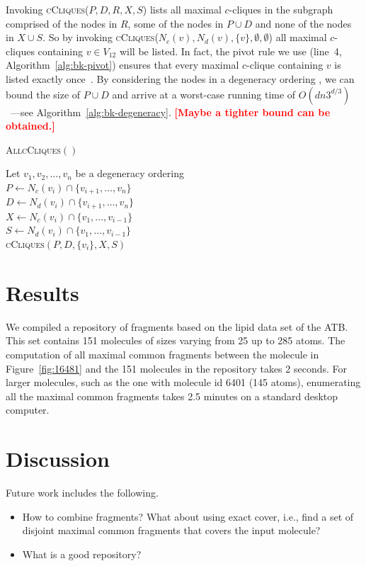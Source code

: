 \documentclass[11pt]{article}
\newcommand{\todo}[1]{\xspace{\bfseries\sffamily\textcolor{red}{[#1]}}\xspace}
\begin{document}
Invoking \textsc{cCliques}($P, D, R, X, S$) lists all maximal $c$-cliques in the
subgraph comprised of the nodes in $R$, some of the nodes in $P \cup D$
and none of the nodes in $X \cup S$. So by invoking \textsc{cCliques}($N_c(v),
N_d(v), \{ v \}, \emptyset, \emptyset$) all maximal $c$-cliques containing $v
\in V_{12}$ will be listed. In fact, the pivot rule we use (line~4,
Algorithm~\ref{alg:bk-pivot}) ensures that every maximal $c$-clique containing
$v$ is listed exactly once~\cite{Tomita:2006kb}. By considering the nodes in a
degeneracy ordering \cite{Eppstein:2010uq}, we can bound the size of $P \cup D$
and arrive at a worst-case running time of
$O(dn3^{d/3})$~\cite{Eppstein:2010uq}---see Algorithm~\ref{alg:bk-degeneracy}.
\todo{Maybe a tighter bound can be obtained.}

\begin{algorithm2e}
  \caption{\textsc{AllcCliques}$()$}
  \label{alg:bk-degeneracy}
  Let $v_1, v_2, \ldots, v_n$ be a degeneracy ordering\\
  {
    $P \leftarrow N_c(v_i) \cap \{v_{i+1}, \ldots, v_n\}$\\
    $D \leftarrow N_d(v_i) \cap \{v_{i+1}, \ldots, v_n\}$\\
    $X \leftarrow N_c(v_i) \cap \{v_1, \ldots, v_{i-1}\}$\\
    $S \leftarrow N_d(v_i) \cap \{v_1, \ldots, v_{i-1}\}$\\
    \textsc{cCliques}$(P, D, \{v_i\}, X, S)$
  }
\end{algorithm2e}

\section{Results}

We compiled a repository of fragments based on the lipid data set of the ATB. 
This set contains 151 molecules of sizes varying from 25 up to 285 atoms. 
The computation of all maximal common fragments between the molecule in 
Figure~\ref{fig:16481} and the 151 molecules in the repository takes 2 seconds. 
For larger molecules, such as the one with molecule id 6401 (145 atoms), 
enumerating all the maximal common fragments takes 2.5 minutes on a standard
desktop computer.

\section{Discussion}

Future work includes the following.
\begin{itemize}
  \item How to combine fragments? What about using exact cover, i.e., find a set
    of disjoint maximal common fragments that covers the input molecule?
  \item What is a good repository?
\end{itemize}



\end{document}
